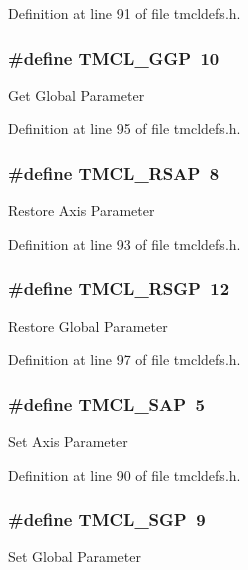 Definition at line 91 of file tmcldefs.h.\hypertarget{group__ParComm_ga4bf884d087a29a85073718bbd0d4f928}{
\subsubsection[{TMCL\_\-GGP}]{\setlength{\rightskip}{0pt plus 5cm}\#define TMCL\_\-GGP~10}}
\label{group__ParComm_ga4bf884d087a29a85073718bbd0d4f928}
Get Global Parameter 

Definition at line 95 of file tmcldefs.h.\hypertarget{group__ParComm_gab338e76ee77e5f122d1694c728beb5e3}{
\subsubsection[{TMCL\_\-RSAP}]{\setlength{\rightskip}{0pt plus 5cm}\#define TMCL\_\-RSAP~8}}
\label{group__ParComm_gab338e76ee77e5f122d1694c728beb5e3}
Restore Axis Parameter 

Definition at line 93 of file tmcldefs.h.\hypertarget{group__ParComm_ga21517120fb13310ef4416fd370fa91b6}{
\subsubsection[{TMCL\_\-RSGP}]{\setlength{\rightskip}{0pt plus 5cm}\#define TMCL\_\-RSGP~12}}
\label{group__ParComm_ga21517120fb13310ef4416fd370fa91b6}
Restore Global Parameter 

Definition at line 97 of file tmcldefs.h.\hypertarget{group__ParComm_ga9d041a48b17f51e16e6219d3cfe5a2ca}{
\subsubsection[{TMCL\_\-SAP}]{\setlength{\rightskip}{0pt plus 5cm}\#define TMCL\_\-SAP~5}}
\label{group__ParComm_ga9d041a48b17f51e16e6219d3cfe5a2ca}
Set Axis Parameter 

Definition at line 90 of file tmcldefs.h.\hypertarget{group__ParComm_ga12919729038b159bb1f9b275c9c8f5bc}{
\subsubsection[{TMCL\_\-SGP}]{\setlength{\rightskip}{0pt plus 5cm}\#define TMCL\_\-SGP~9}}
\label{group__ParComm_ga12919729038b159bb1f9b275c9c8f5bc}
Set Global Parameter 

